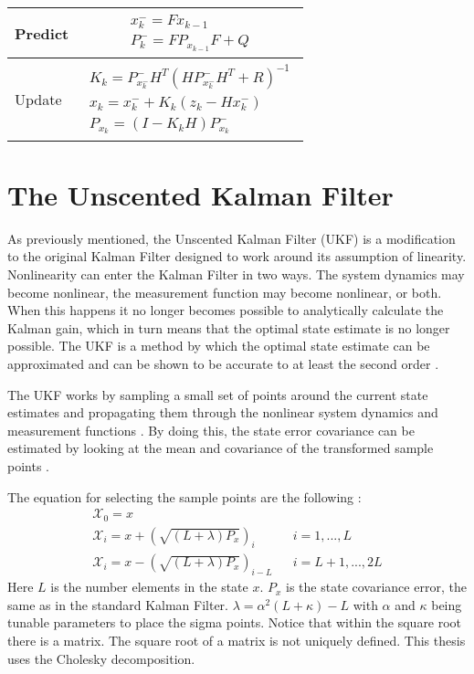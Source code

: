 \begin{center}
\begin{tabular}{ | m{5em} | m{1cm}| } 
	\hline
	Predict & 
	\begin{align*} 
	x^-_{k} = Fx_{k-1} \\ 
	P^-_{k} = FP_{x_{k-1}}F + Q 
	\end{align*}\\ 
	\hline
	Update & 
	\begin{align*} 
	K_{k} = P^-_{x^-_k}H^T(HP^-_{x^-_k}H^T + R)^{-1} \\
	x_{k} = x^-_{k} + K_k(z_k - Hx^-_k) \\ 
	P_{x_k} = (I - K_kH)P^-_{x_k} 
	\end{align*}\\ 
	\hline
\end{tabular}
\end{center}


\section*{The Unscented Kalman Filter}

As previously mentioned, the Unscented Kalman Filter (UKF) is a modification to the original Kalman Filter designed to work around its assumption of linearity. Nonlinearity can enter the Kalman Filter in two ways. The system dynamics may become nonlinear, the measurement function may become nonlinear, or both. When this happens it no longer becomes possible to analytically calculate the Kalman gain, which in turn means that the optimal state estimate is no longer possible. The UKF is a method by which the optimal state estimate can be approximated and can be shown to be accurate to at least the second order \cite{ukf_merwe}.

The UKF works by sampling a small set of points around the current state estimates and propagating them through the nonlinear system dynamics and measurement functions \cite{ukf_merwe}. By doing this, the state error covariance can be estimated by looking at the mean and covariance of the transformed sample points \cite{ukf_merwe}.



The equation for selecting the sample points are the following \cite{ukf_merwe}:
\begin{align}
\mathcal{X}_0 = x \\
\mathcal{X}_i = x + (\sqrt{(L + \lambda)P_x})_i && i = 1,...,L \\
\mathcal{X}_i = x - (\sqrt{(L + \lambda)P_x})_{i-L} && i = L+1,...,2L
\end{align}
Here $L$ is the number elements in the state $x$. $P_x$ is the state covariance error, the same as in the standard Kalman Filter. $\lambda = \alpha^2(L + \kappa) - L$ with $\alpha$ and $\kappa$ being tunable parameters to place the sigma points. Notice that within the square root there is a matrix. The square root of a matrix is not uniquely defined. This thesis uses the Cholesky decomposition.

